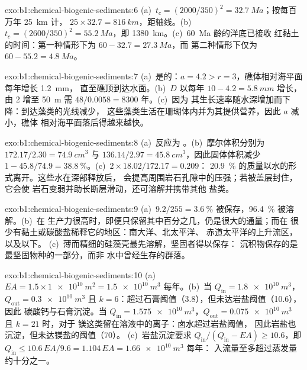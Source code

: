 \begin{solution}{exo:b1:chemical-biogenic-sediments:6}
(a)~$t_c = (2000/350)^2 = \qty{32.7}{Ma}$；按每百万年 \qty{25}{km} 计，
$25\times32.7 = \qty{816}{km}$，距轴线。(b)~$t_c = (2600/350)^2 =
\qty{55.2}{Ma}$，即 \qty{1380}{km}。(c)~\qty{60}{Ma} 龄的洋底已接收
红黏土的时间：第一种情形下为 $60 - 32.7 = \qty{27.3}{Ma}$，而
第二种情形下仅为 $60 - 55.2 = \qty{4.8}{Ma}$。
\end{solution}

\begin{solution}{exo:b1:chemical-biogenic-sediments:7}
(a)~是的：$a = 4.2 > r = 3$，礁体相对海平面每年增长 \qty{1.2}{mm}，
直至礁顶到达水面。(b)~$D$ 以每年 $10 - 4.2 = \qty{5.8}{mm}$ 增长，
由 2 增至 \qty{50}{m} 需 $48/0.0058 = \num{8300}$ 年。(c)~因为
其生长速率随水深增加而下降：到达藻类的光线减少，
这些藻类生活在珊瑚体内并为其提供营养，因此 $a$ 减小，礁体
相对海平面落后得越来越快。
\end{solution}

\begin{solution}{exo:b1:chemical-biogenic-sediments:8}
(a)~反应为 。(b)~摩尔体积分别为 $172.17/2.30 =
\qty{74.9}{cm^3}$ 与 $136.14/2.97 = \qty{45.8}{cm^3}$，因此固体体积减少
$1 - 45.8/74.9 = \qty{38.8}{\%}$。(c)~$2\times18.02/172.17 = 0.209$：
\qty{20.9}{\%} 的质量以水的形式离开。这些水在深部释放后，
会提高周围岩石孔隙中的压强；若被盖层封住，它会使
岩石变弱并助长断层滑动，还可溶解并携带其他
盐类。
\end{solution}

\begin{solution}{exo:b1:chemical-biogenic-sediments:9}
(a)~$9.2/255 = \qty{3.6}{\%}$ 被保存，\qty{96.4}{\%} 被溶解。(b)~在
生产力很高时，即便只保留其中百分之几，仍是很大的通量；而在
很少有黏土或碳酸盐稀释它的地区：南大洋、北太平洋、
赤道太平洋的上升流区，以及以下。
(c)~薄而精细的硅藻壳最先溶解，坚固者得以保存：
沉积物保存的是最坚固物种的一部分，而非
水中曾经生存的群落。
\end{solution}

\begin{solution}{exo:b1:chemical-biogenic-sediments:10}
(a)~$EA = 1.5\times\qty{1e10}{m^2} = \qty{1.5e10}{m^3}$ 每年。(b)~当
$Q_{\mathrm{in}} = \qty{1.8e10}{m^3}$，$Q_{\mathrm{out}} = \qty{0.3e10}{m^3}$ 且
$k = 6$：超过石膏阈值（3.8），但未达岩盐阈值（10.6），因此
碳酸钙与石膏沉淀。当 $Q_{\mathrm{in}} =
\qty{1.575e10}{m^3}$，$Q_{\mathrm{out}} = \qty{0.075e10}{m^3}$ 且 $k = 21$ 时，对于
镁这类留在溶液中的离子：卤水超过岩盐阈值，
因此岩盐也沉淀，但未达镁盐的阈值（70）。
(c)~岩盐沉淀要求 $Q_{\mathrm{in}}/(Q_{\mathrm{in}} - EA) \ge 10.6$，即
$Q_{\mathrm{in}} \le 10.6\,EA/9.6 = 1.104\,EA = \qty{1.66e10}{m^3}$ 每年：
入流量至多超过蒸发量约十分之一。
\end{solution}

